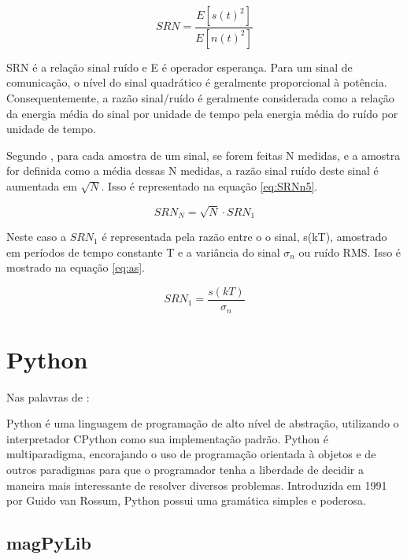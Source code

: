 \begin{equation}
    \label{eq:sr2}
    SRN = \frac{E[s(t)^2]}{E[n(t)^2]}
\end{equation}

SRN é a relação sinal ruído e E é operador esperança. Para um sinal de comunicação, o nível do sinal quadrático é geralmente proporcional à potência. Consequentemente, a razão sinal/ruído é geralmente considerada como a relação da energia média do sinal por unidade de tempo pela energia média do ruído por unidade de tempo. \cite{haykinintrodução}
 
Segundo \cite{noiseRedArt}, para cada amostra de um sinal, se forem feitas N medidas, e a amostra for definida como a média dessas N medidas, a razão sinal ruído deste sinal é aumentada em $\sqrt{N}$. Isso é representado na equação \ref{eq:SRNn5}.

\begin{equation}
    \label{eq:SRNn5}
    SRN_N = \sqrt{N}\cdot SRN_1
\end{equation}

Neste caso a $SRN_1$ é representada pela razão entre o o sinal, s(kT), amostrado em períodos de tempo constante T e a variância do sinal $\sigma _n$ ou ruído RMS. Isso é mostrado na equação \ref{eq:as}. \cite{noiseRedArt}

\begin{equation}
    \label{eq:as}
    SRN_1 = \frac{s(kT)}{\sigma _n}
\end{equation}

\section{Python}
Nas palavras de \cite{bandeira2019}:
\begin{quoting}[rightmargin=0cm,leftmargin=4cm]
{\footnotesize 
Python é uma linguagem de programação de alto nível de abstração, utilizando o interpretador CPython como sua implementação padrão. Python é multiparadigma, encorajando o uso de programação orientada à objetos e de outros paradigmas para que o programador tenha a liberdade de decidir a maneira mais interessante de resolver diversos problemas. Introduzida em 1991 por Guido van Rossum,
Python possui uma gramática simples e poderosa.
}

\end{quoting}

\subsection{magPyLib}


